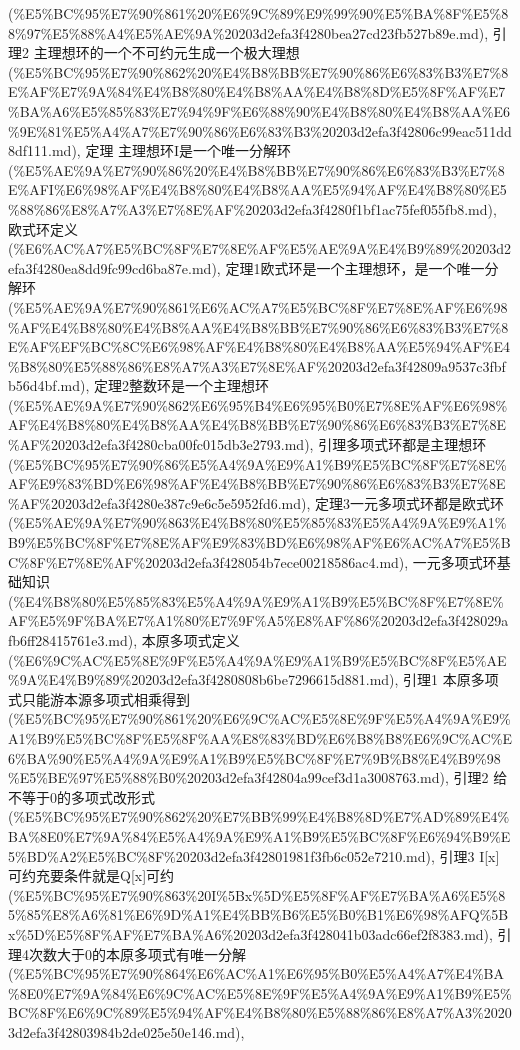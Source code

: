\begin{note}[第四章整环里面的因子分解]
(\%E5\%BC\%95\%E7\%90\%861\%20\%E6\%9C\%89\%E9\%99\%90\%E5\%BA\%8F\%E5\%88\%97\%E5\%88\%A4\%E5\%AE\%9A\%20203d2efa3f4280bea27cd23fb527b89e.md), 引理2 主理想环的一个不可约元生成一个极大理想 (\%E5\%BC\%95\%E7\%90\%862\%20\%E4\%B8\%BB\%E7\%90\%86\%E6\%83\%B3\%E7\%8E\%AF\%E7\%9A\%84\%E4\%B8\%80\%E4\%B8\%AA\%E4\%B8\%8D\%E5\%8F\%AF\%E7\%BA\%A6\%E5\%85\%83\%E7\%94\%9F\%E6\%88\%90\%E4\%B8\%80\%E4\%B8\%AA\%E6\%9E\%81\%E5\%A4\%A7\%E7\%90\%86\%E6\%83\%B3\%20203d2efa3f42806c99eac511dd8df111.md), 定理 主理想环I是一个唯一分解环 (\%E5\%AE\%9A\%E7\%90\%86\%20\%E4\%B8\%BB\%E7\%90\%86\%E6\%83\%B3\%E7\%8E\%AFI\%E6\%98\%AF\%E4\%B8\%80\%E4\%B8\%AA\%E5\%94\%AF\%E4\%B8\%80\%E5\%88\%86\%E8\%A7\%A3\%E7\%8E\%AF\%20203d2efa3f4280f1bf1ac75fef055fb8.md), 欧式环定义 (\%E6\%AC\%A7\%E5\%BC\%8F\%E7\%8E\%AF\%E5\%AE\%9A\%E4\%B9\%89\%20203d2efa3f4280ea8dd9fc99cd6ba87e.md), 定理1欧式环是一个主理想环，是一个唯一分解环 (\%E5\%AE\%9A\%E7\%90\%861\%E6\%AC\%A7\%E5\%BC\%8F\%E7\%8E\%AF\%E6\%98\%AF\%E4\%B8\%80\%E4\%B8\%AA\%E4\%B8\%BB\%E7\%90\%86\%E6\%83\%B3\%E7\%8E\%AF\%EF\%BC\%8C\%E6\%98\%AF\%E4\%B8\%80\%E4\%B8\%AA\%E5\%94\%AF\%E4\%B8\%80\%E5\%88\%86\%E8\%A7\%A3\%E7\%8E\%AF\%20203d2efa3f42809a9537c3fbfb56d4bf.md), 定理2整数环是一个主理想环 (\%E5\%AE\%9A\%E7\%90\%862\%E6\%95\%B4\%E6\%95\%B0\%E7\%8E\%AF\%E6\%98\%AF\%E4\%B8\%80\%E4\%B8\%AA\%E4\%B8\%BB\%E7\%90\%86\%E6\%83\%B3\%E7\%8E\%AF\%20203d2efa3f4280cba00fc015db3e2793.md), 引理多项式环都是主理想环 (\%E5\%BC\%95\%E7\%90\%86\%E5\%A4\%9A\%E9\%A1\%B9\%E5\%BC\%8F\%E7\%8E\%AF\%E9\%83\%BD\%E6\%98\%AF\%E4\%B8\%BB\%E7\%90\%86\%E6\%83\%B3\%E7\%8E\%AF\%20203d2efa3f4280e387c9e6c5e5952fd6.md), 定理3一元多项式环都是欧式环 (\%E5\%AE\%9A\%E7\%90\%863\%E4\%B8\%80\%E5\%85\%83\%E5\%A4\%9A\%E9\%A1\%B9\%E5\%BC\%8F\%E7\%8E\%AF\%E9\%83\%BD\%E6\%98\%AF\%E6\%AC\%A7\%E5\%BC\%8F\%E7\%8E\%AF\%20203d2efa3f428054b7ece00218586ac4.md), 一元多项式环基础知识 (\%E4\%B8\%80\%E5\%85\%83\%E5\%A4\%9A\%E9\%A1\%B9\%E5\%BC\%8F\%E7\%8E\%AF\%E5\%9F\%BA\%E7\%A1\%80\%E7\%9F\%A5\%E8\%AF\%86\%20203d2efa3f428029afb6ff28415761e3.md), 本原多项式定义 (\%E6\%9C\%AC\%E5\%8E\%9F\%E5\%A4\%9A\%E9\%A1\%B9\%E5\%BC\%8F\%E5\%AE\%9A\%E4\%B9\%89\%20203d2efa3f4280808b6be7296615d881.md), 引理1 本原多项式只能游本源多项式相乘得到 (\%E5\%BC\%95\%E7\%90\%861\%20\%E6\%9C\%AC\%E5\%8E\%9F\%E5\%A4\%9A\%E9\%A1\%B9\%E5\%BC\%8F\%E5\%8F\%AA\%E8\%83\%BD\%E6\%B8\%B8\%E6\%9C\%AC\%E6\%BA\%90\%E5\%A4\%9A\%E9\%A1\%B9\%E5\%BC\%8F\%E7\%9B\%B8\%E4\%B9\%98\%E5\%BE\%97\%E5\%88\%B0\%20203d2efa3f42804a99cef3d1a3008763.md), 引理2 给不等于0的多项式改形式 (\%E5\%BC\%95\%E7\%90\%862\%20\%E7\%BB\%99\%E4\%B8\%8D\%E7\%AD\%89\%E4\%BA\%8E0\%E7\%9A\%84\%E5\%A4\%9A\%E9\%A1\%B9\%E5\%BC\%8F\%E6\%94\%B9\%E5\%BD\%A2\%E5\%BC\%8F\%20203d2efa3f42801981f3fb6c052e7210.md), 引理3 I[x]可约充要条件就是Q[x]可约 (\%E5\%BC\%95\%E7\%90\%863\%20I\%5Bx\%5D\%E5\%8F\%AF\%E7\%BA\%A6\%E5\%85\%85\%E8\%A6\%81\%E6\%9D\%A1\%E4\%BB\%B6\%E5\%B0\%B1\%E6\%98\%AFQ\%5Bx\%5D\%E5\%8F\%AF\%E7\%BA\%A6\%20203d2efa3f428041b03adc66ef2f8383.md), 引理4次数大于0的本原多项式有唯一分解 (\%E5\%BC\%95\%E7\%90\%864\%E6\%AC\%A1\%E6\%95\%B0\%E5\%A4\%A7\%E4\%BA\%8E0\%E7\%9A\%84\%E6\%9C\%AC\%E5\%8E\%9F\%E5\%A4\%9A\%E9\%A1\%B9\%E5\%BC\%8F\%E6\%9C\%89\%E5\%94\%AF\%E4\%B8\%80\%E5\%88\%86\%E8\%A7\%A3\%20203d2efa3f42803984b2de025e50e146.md), 
\end{note}
